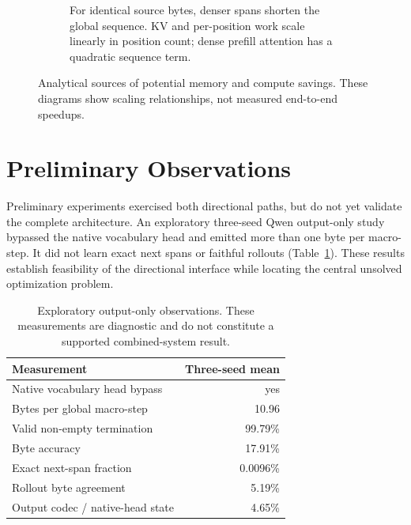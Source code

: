 \documentclass[10pt,twocolumn]{article}
\begin{document}
\begin{figure}[t]
\begin{subfigure}[t]{0.49\textwidth}
{}
\caption{For identical source bytes, denser spans shorten the global sequence. KV and per-position
work scale linearly in position count; dense prefill attention has a quadratic sequence term.}
\label{fig:positionbars}
\end{subfigure}
\caption{Analytical sources of potential memory and compute savings. These diagrams show scaling
relationships, not measured end-to-end speedups.}
\label{fig:systems}
\end{figure}

\section{Preliminary Observations}

Preliminary experiments exercised both directional paths, but do not yet validate the complete
architecture. An exploratory three-seed Qwen output-only study bypassed the native vocabulary head
and emitted more than one byte per macro-step. It did not learn exact next spans or faithful
rollouts (Table~\ref{tab:prototype}). These results establish feasibility of the directional
interface while locating the central unsolved optimization problem.

\begin{table}[t]
\centering
\caption{Exploratory output-only observations. These measurements are diagnostic and do not
constitute a supported combined-system result.}
\label{tab:prototype}
\small
\begin{tabularx}{\columnwidth}{@{}X r@{}}
\toprule
Measurement & Three-seed mean \\
\midrule
Native vocabulary head bypass & yes \\
Bytes per global macro-step & 10.96 \\
Valid non-empty termination & 99.79\% \\
Byte accuracy & 17.91\% \\
Exact next-span fraction & 0.0096\% \\
Rollout byte agreement & 5.19\% \\
Output codec / native-head state & 4.65\% \\
\bottomrule
\end{tabularx}
\end{table}
\end{document}
